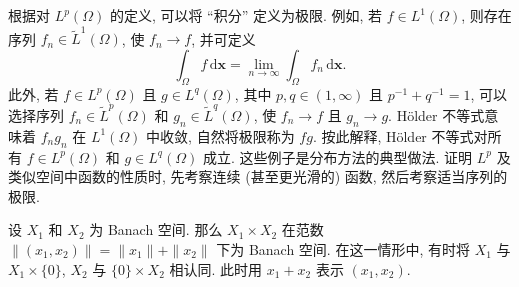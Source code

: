 根据对 $L^p(\Omega)$ 的定义, 可以将 ``积分'' 定义为极限. 例如, 若 $f\in L^1(\Omega)$, 则存在序列 $f_n\in\widetilde L^1(\Omega)$, 使 $f_n\to f$, 并可定义
\begin{equation}\label{eq:lp-completion-integral-definition}
\int_\Omega f\,\mathrm{d}\bm{x}=\lim_{n\to\infty}\int_\Omega f_n\,\mathrm{d}\bm{x}.
\end{equation}
此外, 若 $f\in L^p(\Omega)$ 且 $g\in L^q(\Omega)$, 其中 $p,q\in(1,\infty)$ 且 $p^{-1}+q^{-1}=1$, 可以选择序列 $f_n\in\widetilde L^p(\Omega)$ 和 $g_n\in\widetilde L^q(\Omega)$, 使 $f_n\to f$ 且 $g_n\to g$. Hölder 不等式意味着 $f_ng_n$ 在 $L^1(\Omega)$ 中收敛, 自然将极限称为 $fg$. 按此解释, Hölder 不等式对所有 $f\in L^p(\Omega)$ 和 $g\in L^q(\Omega)$ 成立. 这些例子是分布方法的典型做法. 证明 $L^p$ 及类似空间中函数的性质时, 先考察连续 (甚至更光滑的) 函数, 然后考察适当序列的极限.

\begin{Example}
\label{ex:banach-direct-product}
设 $X_1$ 和 $X_2$ 为 Banach 空间. 那么 $X_1\times X_2$ 在范数 $\|(x_1,x_2)\|=\|x_1\|+\|x_2\|$ 下为 Banach 空间. 在这一情形中, 有时将 $X_1$ 与 $X_1\times\{0\}$, $X_2$ 与 $\{0\}\times X_2$ 相认同. 此时用 $x_1+x_2$ 表示 $(x_1,x_2)$.
\end{Example}
